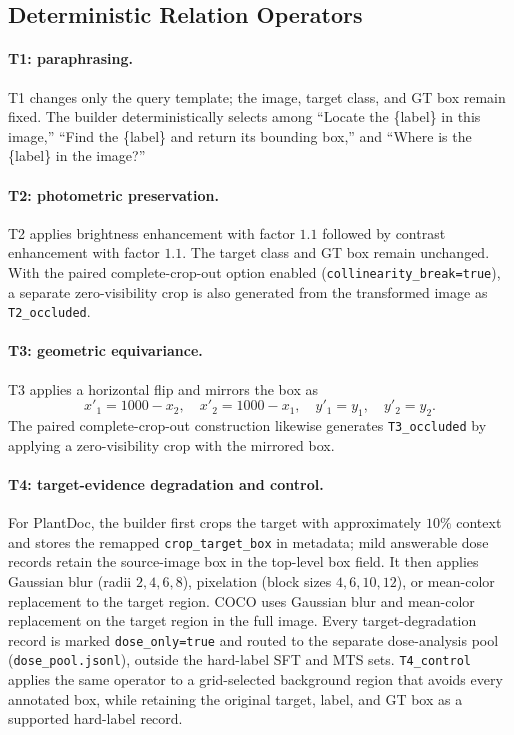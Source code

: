 \documentclass[letterpaper]{article}
\begin{document}
\subsection{Deterministic Relation Operators}

\paragraph{T1: paraphrasing.}
T1 changes only the query template; the image, target class, and GT box remain
fixed. The builder deterministically selects among ``Locate the \{label\} in
this image,'' ``Find the \{label\} and return its bounding box,'' and ``Where
is the \{label\} in the image?''

\paragraph{T2: photometric preservation.}
T2 applies brightness enhancement with factor $1.1$ followed by contrast
enhancement with factor $1.1$. The target class and GT box remain unchanged.
With the paired complete-crop-out option enabled
(\texttt{collinearity\_break=true}), a separate zero-visibility crop is also
generated from the transformed image as \texttt{T2\_occluded}.

\paragraph{T3: geometric equivariance.}
T3 applies a horizontal flip and mirrors the box as
\[
x'_1=1000-x_2,\quad x'_2=1000-x_1,\quad
y'_1=y_1,\quad y'_2=y_2.
\]
The paired complete-crop-out construction likewise generates
\texttt{T3\_occluded} by applying a zero-visibility crop with the mirrored box.

\paragraph{T4: target-evidence degradation and control.}
For PlantDoc, the builder first crops the target with approximately $10\%$
context and stores the remapped \texttt{crop\_target\_box} in metadata; mild
answerable dose records retain the source-image box in the top-level box field.
It then applies
Gaussian blur (radii $2,4,6,8$), pixelation (block sizes $4,6,10,12$), or
mean-color replacement to the target region. COCO uses Gaussian blur and
mean-color replacement on the target region in the full image. Every
target-degradation record is marked \texttt{dose\_only=true} and routed to the
separate dose-analysis pool (\texttt{dose\_pool.jsonl}), outside the hard-label
SFT and MTS sets.
\texttt{T4\_control} applies the same operator to a grid-selected background
region that avoids every annotated box, while retaining the original target,
label, and GT box as a supported hard-label record.
\end{document}
